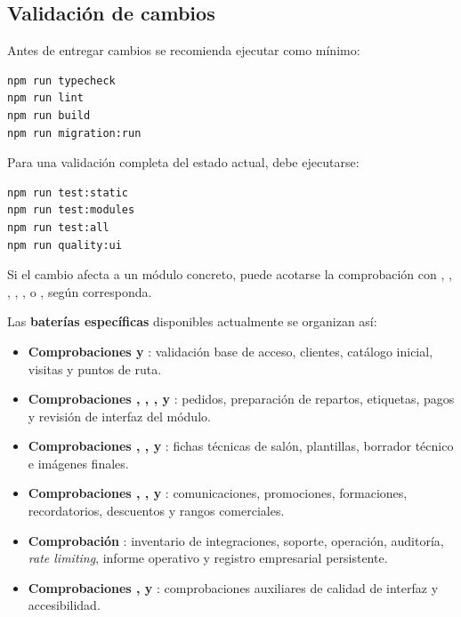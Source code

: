 \subsection{Validación de cambios}

Antes de entregar cambios se recomienda ejecutar como mínimo:

\begin{lstlisting}[language=bash]
npm run typecheck
npm run lint
npm run build
npm run migration:run
\end{lstlisting}

Para una validación completa del estado actual, debe ejecutarse:

\begin{lstlisting}[language=bash]
npm run test:static
npm run test:modules
npm run test:all
npm run quality:ui
\end{lstlisting}

Si el cambio afecta a un módulo concreto, puede acotarse la comprobación con , , , , ,  o , según corresponda.

Las \textbf{baterías específicas} disponibles actualmente se organizan así:

\begin{itemize}
    \item \textbf{Comprobaciones  y }: validación base de acceso, clientes, catálogo inicial, visitas y puntos de ruta.
    \item \textbf{Comprobaciones , , ,  y }: pedidos, preparación de repartos, etiquetas, pagos y revisión de interfaz del módulo.
    \item \textbf{Comprobaciones , ,  y }: fichas técnicas de salón, plantillas, borrador técnico e imágenes finales.
    \item \textbf{Comprobaciones , ,  y }: comunicaciones, promociones, formaciones, recordatorios, descuentos y rangos comerciales.
    \item \textbf{Comprobación }: inventario de integraciones, soporte, operación, auditoría, \textit{rate limiting}, informe operativo y registro empresarial persistente.
    \item \textbf{Comprobaciones ,  y }: comprobaciones auxiliares de calidad de interfaz y accesibilidad.
\end{itemize}

